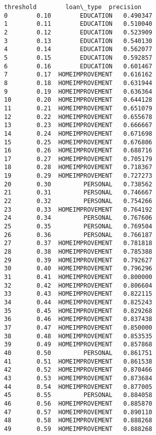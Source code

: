 \documentclass[11pt]{article}
\makeatletter
\newcommand{\boxspacing}{\kern\kvtcb@left@rule\kern\kvtcb@boxsep}
\newcommand{\prompt}[4]{
        {\ttfamily\llap{{\color{#2}[#3]:\hspace{3pt}#4}}\vspace{-\baselineskip}}
    }
\makeatother
\begin{document}
            \begin{tcolorbox}[breakable, size=fbox, boxrule=.5pt, pad at break*=1mm, opacityfill=0]
\prompt{Out}{outcolor}{ }{\boxspacing}
\begin{Verbatim}[commandchars=\\\{\}]
    threshold        loan\_type  precision
0        0.10        EDUCATION   0.490347
1        0.11        EDUCATION   0.510040
2        0.12        EDUCATION   0.523909
3        0.13        EDUCATION   0.540130
4        0.14        EDUCATION   0.562077
5        0.15        EDUCATION   0.592857
6        0.16        EDUCATION   0.601467
7        0.17  HOMEIMPROVEMENT   0.616162
8        0.18  HOMEIMPROVEMENT   0.631944
9        0.19  HOMEIMPROVEMENT   0.636364
10       0.20  HOMEIMPROVEMENT   0.644128
11       0.21  HOMEIMPROVEMENT   0.651079
12       0.22  HOMEIMPROVEMENT   0.655678
13       0.23  HOMEIMPROVEMENT   0.666667
14       0.24  HOMEIMPROVEMENT   0.671698
15       0.25  HOMEIMPROVEMENT   0.676806
16       0.26  HOMEIMPROVEMENT   0.688716
17       0.27  HOMEIMPROVEMENT   0.705179
18       0.28  HOMEIMPROVEMENT   0.718367
19       0.29  HOMEIMPROVEMENT   0.727273
20       0.30         PERSONAL   0.738562
21       0.31         PERSONAL   0.746667
22       0.32         PERSONAL   0.754266
23       0.33  HOMEIMPROVEMENT   0.764192
24       0.34         PERSONAL   0.767606
25       0.35         PERSONAL   0.769504
26       0.36         PERSONAL   0.766187
27       0.37  HOMEIMPROVEMENT   0.781818
28       0.38  HOMEIMPROVEMENT   0.785388
29       0.39  HOMEIMPROVEMENT   0.792627
30       0.40  HOMEIMPROVEMENT   0.796296
31       0.41  HOMEIMPROVEMENT   0.800000
32       0.42  HOMEIMPROVEMENT   0.806604
33       0.43  HOMEIMPROVEMENT   0.822115
34       0.44  HOMEIMPROVEMENT   0.825243
35       0.45  HOMEIMPROVEMENT   0.829268
36       0.46  HOMEIMPROVEMENT   0.837438
37       0.47  HOMEIMPROVEMENT   0.850000
38       0.48  HOMEIMPROVEMENT   0.853535
39       0.49  HOMEIMPROVEMENT   0.857868
40       0.50         PERSONAL   0.861751
41       0.51  HOMEIMPROVEMENT   0.861538
42       0.52  HOMEIMPROVEMENT   0.870466
43       0.53  HOMEIMPROVEMENT   0.873684
44       0.54  HOMEIMPROVEMENT   0.877005
45       0.55         PERSONAL   0.884058
46       0.56  HOMEIMPROVEMENT   0.885870
47       0.57  HOMEIMPROVEMENT   0.890110
48       0.58  HOMEIMPROVEMENT   0.888268
49       0.59  HOMEIMPROVEMENT   0.888268
\end{Verbatim}
\end{tcolorbox}
        
\end{document}
